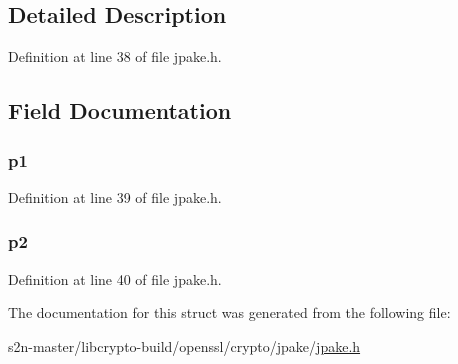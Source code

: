 \subsection{Detailed Description}


Definition at line 38 of file jpake.\+h.



\subsection{Field Documentation}
\subsubsection[{\texorpdfstring{p1}{p1}}]{ p1}\hypertarget{struct_j_p_a_k_e___s_t_e_p1_a2d05ea7e4f2e2d9c9d962924118fd6c1}{}\label{struct_j_p_a_k_e___s_t_e_p1_a2d05ea7e4f2e2d9c9d962924118fd6c1}


Definition at line 39 of file jpake.\+h.

\subsubsection[{\texorpdfstring{p2}{p2}}]{ p2}\hypertarget{struct_j_p_a_k_e___s_t_e_p1_a93200fcdf47251b89b07183d1c2628e0}{}\label{struct_j_p_a_k_e___s_t_e_p1_a93200fcdf47251b89b07183d1c2628e0}


Definition at line 40 of file jpake.\+h.



The documentation for this struct was generated from the following file\+:\begin{DoxyCompactItemize}
\item 
s2n-\/master/libcrypto-\/build/openssl/crypto/jpake/\hyperlink{jpake_8h}{jpake.\+h}\end{DoxyCompactItemize}
